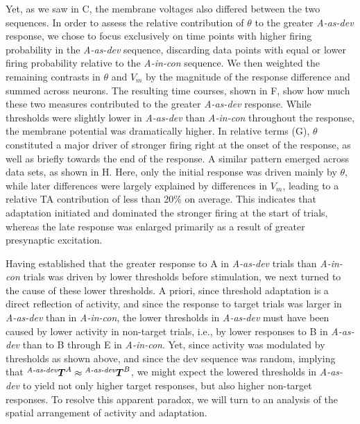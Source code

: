 \documentclass[9pt,lineno,onehalfspacing]{elife}
\newcommand{\dev}{\textit{A-as-dev}}
\newcommand{\msc}{\textit{A-in-con}}
\newcommand{\std}{\textit{A-as-std}}
\newcommand{\ifstringequal}[4]{%
  \ifnum\pdfstrcmp{#1}{#2}=0
  #3%
  \else
  #4%
  \fi
}
\newcommand{\seqreplace}[1]{\ifstringequal{dev}{#1}{\dev}{%
    \ifstringequal{std}{#1}{\std}{%
        \ifstringequal{msc}{#1}{\msc}{#1}%
    }%
}}
\newcommand{\T}[3][]{{}^{\seqreplace{#1}}_{}\boldsymbol T^{#2}_{#3}}
\begin{document}
Yet, as we saw in C, the membrane voltages also differed between the two sequences. In order to assess the relative contribution of $\theta$ to the greater \dev{} response, we chose to focus exclusively on time points with higher firing probability in the \dev{} sequence, discarding data points with equal or lower firing probability relative to the \msc{} sequence. We then weighted the remaining contrasts in $\theta$ and $V_m$ by the magnitude of the response difference and summed across neurons. The resulting time courses, shown in F, show how much these two measures contributed to the greater \dev{} response. While thresholds were slightly lower in \dev{} than \msc{} throughout the response, the membrane potential was dramatically higher. In relative terms (G), $\theta$ constituted a major driver of stronger firing right at the onset of the response, as well as briefly towards the end of the response. A similar pattern emerged across data sets, as shown in H. Here, only the initial response was driven mainly by $\theta$, while later differences were largely explained by differences in $V_m$, leading to a relative TA contribution of less than 20\% on average. This indicates that adaptation initiated and dominated the stronger firing at the start of trials, whereas the late response was enlarged primarily as a result of greater presynaptic excitation.

Having established that the greater response to A in \dev{} trials than \msc{} trials was driven by lower thresholds before stimulation, we next turned to the cause of these lower thresholds. A priori, since threshold adaptation is a direct reflection of activity, and since the response to target trials was larger in \dev{} than in \msc{}, the lower thresholds in \dev{} must have been caused by lower activity in non-target trials, i.e., by lower responses to B in \dev{} than to B through E in \msc{}. Yet, since activity was modulated by thresholds as shown above, and since the dev sequence was random, implying that $\T[dev]{A}{} \approx \T[dev]{B}{}$, we might expect the lowered thresholds in \dev{} to yield not only higher target responses, but also higher non-target responses. To resolve this apparent paradox, we will turn to an analysis of the spatial arrangement of activity and adaptation.
\end{document}
